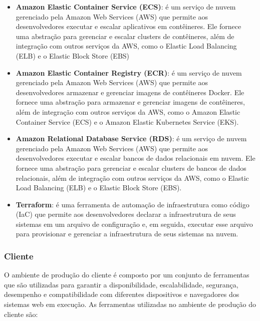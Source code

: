 \begin{itemize}
    \item \textbf{Amazon Elastic Container Service (ECS)}: é um serviço de nuvem gerenciado pela Amazon Web Services (AWS) que permite aos desenvolvedores executar e escalar aplicativos em contêineres. Ele fornece uma abstração para gerenciar e escalar clusters de contêineres, além de integração com outros serviços da AWS, como o Elastic Load Balancing (ELB) e o Elastic Block Store (EBS)
    \item \textbf{Amazon Elastic Container Registry (ECR)}: é um serviço de nuvem gerenciado pela Amazon Web Services (AWS) que permite aos desenvolvedores armazenar e gerenciar imagens de contêineres Docker. Ele fornece uma abstração para armazenar e gerenciar imagens de contêineres, além de integração com outros serviços da AWS, como o Amazon Elastic Container Service (ECS) e o Amazon Elastic Kubernetes Service (EKS).
    \item \textbf{Amazon Relational Database Service (RDS)}: é um serviço de nuvem gerenciado pela Amazon Web Services (AWS) que permite aos desenvolvedores executar e escalar bancos de dados relacionais em nuvem. Ele fornece uma abstração para gerenciar e escalar clusters de bancos de dados relacionais, além de integração com outros serviços da AWS, como o Elastic Load Balancing (ELB) e o Elastic Block Store (EBS).
    \item \textbf{Terraform}: é uma ferramenta de automação de infraestrutura como código (IaC) que permite aos desenvolvedores declarar a infraestrutura de seus sistemas em um arquivo de configuração e, em seguida, executar esse arquivo para provisionar e gerenciar a infraestrutura de seus sistemas na nuvem.
\end{itemize}

\subsubsection{Cliente}

O ambiente de produção do cliente é composto por um conjunto de ferramentas que são utilizadas para garantir a disponibilidade, escalabilidade, segurança, desempenho e compatibilidade com diferentes dispositivos e navegadores dos sistemas web em execução. As ferramentas utilizadas no ambiente de produção do cliente são:

